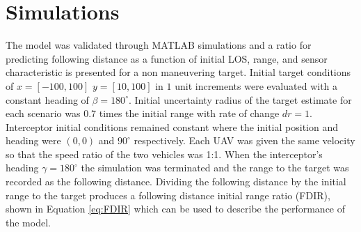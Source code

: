\documentclass[]{aiaa-tc}%
\begin{document}
\section{Simulations}
The model was validated through MATLAB simulations and a ratio for predicting following distance as a function of initial LOS, range, and sensor characteristic is presented for a non maneuvering target. Initial target conditions of $x = [-100,100]$ $y = [10,100]$ in $1$ unit increments were evaluated with a constant heading of $\beta = 180^{\circ}$. Initial uncertainty radius of the target estimate for each scenario was $0.7$ times the initial range with rate of change $dr = 1$. Interceptor initial conditions remained constant where the initial position and heading were $(0,0)$ and $90^{\circ}$ respectively. Each UAV was given the same velocity so that the speed ratio of the two vehicles was 1:1. When the interceptor's heading $\gamma = 180^{\circ}$ the simulation was terminated and the range to the target was recorded as the following distance. Dividing the following distance by the initial range to the target produces a following distance initial range ratio (FDIR), shown in Equation \ref{eq:FDIR} which can be used to describe the performance of the model.





\end{document}

